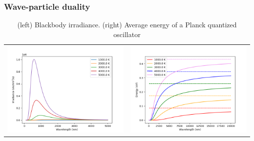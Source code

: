 \documentclass[11pt]{article}
\begin{document}
\subsubsection{Wave-particle duality}
\label{sec:orgf5a4503}

\begin{table}
\caption{(left) Blackbody irradiance. (right) Average energy of a Planck quantized oscillator}
\begin{tabular}{cc}
\includegraphics[scale=0.52]{./Images/BlackBody.png} &
\includegraphics[scale=0.52]{./Images/Planck.png} 
\end{tabular}
\end{table}
\end{document}
